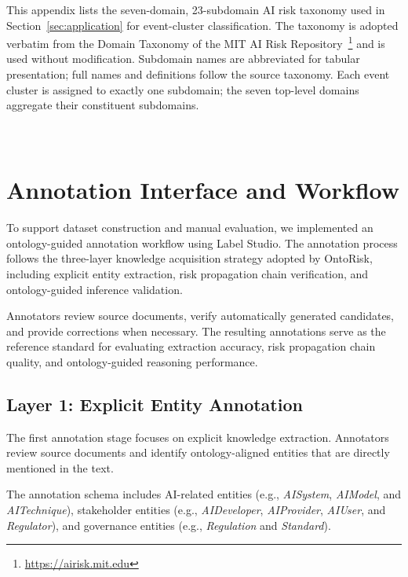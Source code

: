 \documentclass[a4paper,fleqn]{cas-dc}
\begin{document}
This appendix lists the seven-domain, 23-subdomain AI risk taxonomy
used in Section~\ref{sec:application} for event-cluster classification. The taxonomy is
adopted verbatim from the Domain Taxonomy of the MIT AI Risk
Repository~\cite{slattery2026airisk}\footnote{\url{https://airisk.mit.edu}}
and is used without modification. Subdomain names are abbreviated for
tabular presentation; full names and definitions follow the source
taxonomy.
Each event cluster is assigned to exactly one subdomain; the seven
top-level domains aggregate their constituent subdomains.

\setcounter{table}{0}
\setcounter{figure}{0}

\section[Appendix C. Annotation Interface and Workflow]{\mbox{}\\[2pt]Annotation Interface and Workflow}
\label{app:annotation}

To support dataset construction and manual evaluation, we
implemented an ontology-guided annotation workflow using
Label Studio. The annotation process follows the three-layer
knowledge acquisition strategy adopted by OntoRisk, including
explicit entity extraction, risk propagation chain
verification, and ontology-guided inference validation.

Annotators review source documents, verify automatically generated candidates,
and provide corrections when necessary.
The resulting annotations serve as the reference standard for evaluating
extraction accuracy, risk propagation chain quality, and ontology-guided reasoning
performance.

\subsection{Layer 1: Explicit Entity Annotation}

The first annotation stage focuses on explicit knowledge extraction.
Annotators review source documents and identify ontology-aligned entities that
are directly mentioned in the text.

The annotation schema includes AI-related entities (e.g., \textit{AISystem},
\textit{AIModel}, and \textit{AITechnique}), stakeholder entities (e.g.,
\textit{AIDeveloper}, \textit{AIProvider}, \textit{AIUser}, and
\textit{Regulator}), and governance entities (e.g., \textit{Regulation} and
\textit{Standard}).
\end{document}
